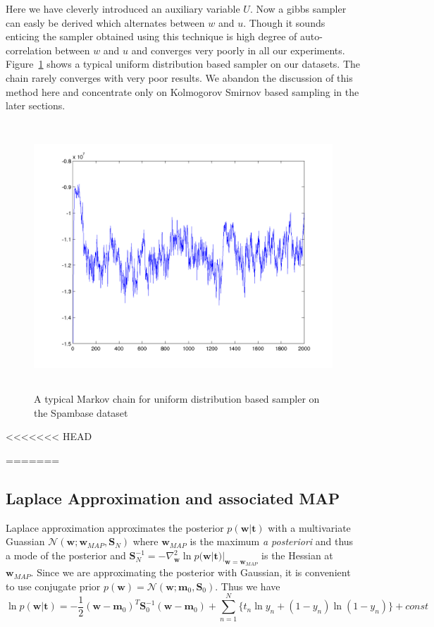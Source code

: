 Here we have cleverly introduced an auxiliary variable $U$.
Now a gibbs sampler can easly be derived which alternates between $w$ and $u$.
Though it sounds enticing the sampler obtained using this technique is high
degree of auto-correlation between $w$ and $u$ and converges very poorly in all
our experiments. Figure~\ref{fig:uniformSamplerChain} shows a typical uniform
distribution based sampler on our datasets. The chain rarely converges with very
poor results. We abandon the discussion of this method here and
concentrate only on Kolmogorov Smirnov based sampling in the later sections.

\begin{figure}[t]
\label{fig:laplace}
\centering
\includegraphics[height=10.0cm]{results/uniformSampleChain.png}

\caption{A typical Markov chain for uniform distribution based sampler on the
Spambase dataset}

\label{fig:uniformSamplerChain}
\end{figure}


<<<<<<< HEAD

=======
\subsection{Laplace Approximation and associated MAP}

Laplace approximation approximates the posterior $p(\bm{w}|\bm{t})$ with a
multivariate Guassian $\mathcal{N}(\bm{w}; \bm{w}_{MAP}, \bm{S}_N)$ where
$\bm{w}_{MAP}$ is the maximum {\it a posteriori} and thus a mode of the
posterior and $\bm{S}_N^{-1} = -\nabla^2_{\bm{w}} \ln
p(\bm{w}|\bm{t})|_{\bm{w} = \bm{w}_{MAP}}$ is the Hessian at $\bm{w}_{MAP}$.
Since we are approximating the posterior with Gaussian, it is convenient to
use conjugate prior $p(\bm{w}) = \mathcal{N}(\bm{w};\bm{m}_0,\bm{S}_0)$. Thus
we have
\begin{equation}
\ln p(\bm{w}|\bm{t}) = -\frac{1}{2}(\bm{w}-\bm{m}_0)^T
\bm{S}_0^{-1}(\bm{w}-\bm{m}_0) + \sum_{n=1}^N\{t_n \ln y_n +(1-y_n) \ln
(1-y_n)\} + const
\end{equation}

